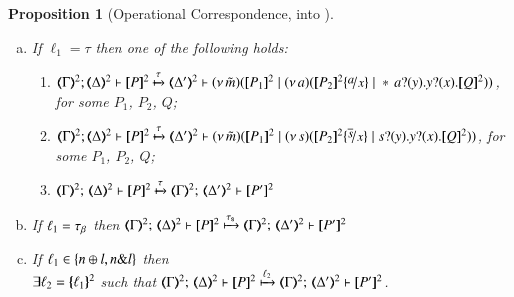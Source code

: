 \documentclass[preprint,11pt]{elsarticle}
\newtheorem{proposition}{Proposition}[section]
\begin{document}
{{\begin{proposition}[Operational Correspondence, \HOp into \sessp]
\begin{enumerate}[1.]
\begin{enumerate}[a)]
			\item	If
				$\ell_1 = \tau$ then one of the following holds:

				\begin{enumerate}[-]
					\item	%
						$
						\horel{\tmap{\Gamma}{2}}{\tmap{\Delta}{2}}{\pmap{P}{2}}
						{\hby{\tau}}
						{\tmap{\Delta'}{2}}{}{\newsp{\tilde{m}}{\pmap{P_1}{2} \Par \newsp{a}
						{\pmap{P_2}{2}\subst{a}{x} \Par \repl{} \binp{a}{y} \binp{y}{x} \pmap{Q}{2}}}}
						$, for some $P_1$, $P_2$, $Q$;

					\item	%
						$
						\horel{\tmap{\Gamma}{2}}{\tmap{\Delta}{2}}{\pmap{P}{2}}
						{\hby{\tau}}
						{\tmap{\Delta'}{2}}{}{\newsp{\tilde{m}}{\pmap{P_1}{2} \Par \newsp{s}
						{\pmap{P_2}{2}\subst{\dual{s}}{x} \Par \binp{s}{y} \binp{y}{x} \pmap{Q}{2}}}}
						$, for some $P_1$, $P_2$, $Q$;

					\item	%
						$\tmap{\Gamma}{2};\, \tmap{\Delta}{2} \proves \pmap{P}{2}
						\hby{\tau}
						\tmap{\Gamma}{2};\, \tmap{\Delta'}{2} \proves \pmap{P'}{2}$


				\end{enumerate}
				
				\item	If $\ell_1 = \tau_{\beta}$ then
						$\tmap{\Gamma}{2};\, \tmap{\Delta}{2} \proves \pmap{P}{2}
						\hby{\stau}
						\tmap{\Gamma}{2};\, \tmap{\Delta'}{2} \proves \pmap{P'}{2}$

				   			   

			\item	 
				If  
				$\ell_1 \in \{n \oplus l, n \& l\}$
				 then \\
				$\exists \ell_2 = \{\!\!\{\ell_1\}\!\!\}^{2}$ such that 
				$\mapt{\Gamma}^{2};\, \mapt{\Delta}^{2} \proves  \map{P}^{2}
				\hby{\ell_2}
				\mapt{\Gamma}^{2};\, \mapt{\Delta'}^{2} \proves  \map{P'}^{2}$.			
		\end{enumerate}
		

\end{enumerate}
\end{proposition}}}
\end{document}
